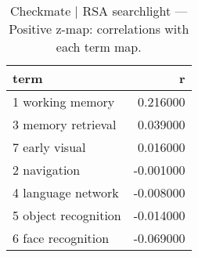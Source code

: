 \begin{table}
\caption{Checkmate | RSA searchlight — Positive z-map: correlations with each term map.}
\label{tab:Checkmate | RSA searchlight_pos}
\begin{tabular}{lr}
\toprule
term & r \\
\midrule
1 working memory & 0.216000 \\
3 memory retrieval & 0.039000 \\
7 early visual & 0.016000 \\
2 navigation & -0.001000 \\
4 language network & -0.008000 \\
5 object recognition & -0.014000 \\
6 face recognition & -0.069000 \\
\bottomrule
\end{tabular}
\end{table}
